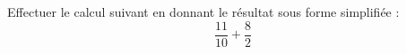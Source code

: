 \documentclass[a4paper,11pt,fleqn]{article}
\begin{document}
        


	
    \def\n{11}
    \def\d{10}
    \def\nb{8}
    \def\db{2}
    
	
    Effectuer le calcul suivant en donnant le résultat sous forme simplifiée : 
    $$\dfrac{\n}{\d} + \dfrac{\nb}{\db}$$
\end{document}
